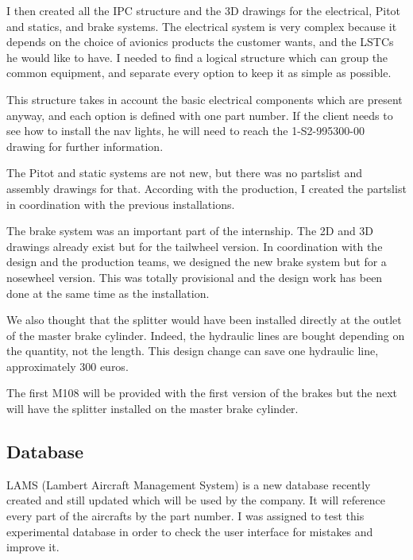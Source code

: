 \documentclass[11pt,a4paper]{report}
\begin{document}
\bigskip

I then created all the IPC structure and the 3D drawings for the electrical, Pitot and statics, and brake systems.
The electrical system is very complex because it depends on the choice of avionics products the customer wants, and the LSTCs he would like to have. I needed to find a logical structure which can group the common equipment, and separate every option to keep it as simple as possible.

This structure takes in account the basic electrical components which are present anyway, and each option is defined with one part number. If the client needs to see how to install the nav lights, he will need to reach the 1-S2-995300-00 drawing for further information.


\bigskip

The Pitot and static systems are not new, but there was no partslist and assembly drawings for that. According with the production, I created the partslist in coordination with the previous installations.

The brake system was an important part of the internship. The 2D and 3D drawings already exist but for the tailwheel version.
In coordination with the design and the production teams, we designed the new brake system but for a nosewheel version. This was totally provisional and the design work has been done at the same time as the installation.

We also thought that the splitter would have been installed directly at the outlet of the master brake cylinder. Indeed, the hydraulic lines are bought depending on the quantity, not the length. This design change can save one hydraulic line, approximately 300 euros.

The first M108 will be provided with the first version of the brakes but the next will have the splitter installed on the master brake cylinder.

\subsection{Database}
LAMS (Lambert Aircraft Management System) is a new database recently created and still updated which will be used by the company. It will reference every part of the aircrafts by the part number.
I was assigned to test this experimental database in order to check the user interface for mistakes and improve it.
\end{document}
